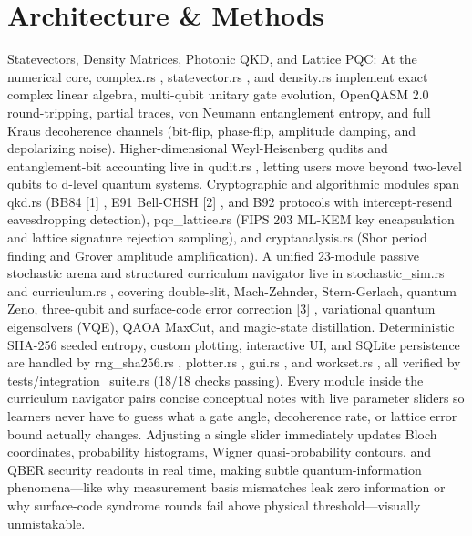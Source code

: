 \documentclass[10pt,letterpaper]{article}
\begin{document}
\section{Architecture \& Methods}
Statevectors, Density Matrices, Photonic QKD, and Lattice PQC: At the numerical core, complex.rs , statevector.rs , and density.rs implement exact complex linear algebra, multi-qubit unitary gate evolution, OpenQASM 2.0 round-tripping, partial traces, von Neumann entanglement entropy, and full Kraus decoherence channels (bit-flip, phase-flip, amplitude damping, and depolarizing noise). Higher-dimensional Weyl-Heisenberg qudits and entanglement-bit accounting live in qudit.rs , letting users move beyond two-level qubits to d-level quantum systems. Cryptographic and algorithmic modules span qkd.rs (BB84 [1] , E91 Bell-CHSH [2] , and B92 protocols with intercept-resend eavesdropping detection), pqc\_lattice.rs (FIPS 203 ML-KEM key encapsulation and lattice signature rejection sampling), and cryptanalysis.rs (Shor period finding and Grover amplitude amplification). A unified 23-module passive stochastic arena and structured curriculum navigator live in stochastic\_sim.rs and curriculum.rs , covering double-slit, Mach-Zehnder, Stern-Gerlach, quantum Zeno, three-qubit and surface-code error correction [3] , variational quantum eigensolvers (VQE), QAOA MaxCut, and magic-state distillation. Deterministic SHA-256 seeded entropy, custom plotting, interactive UI, and SQLite persistence are handled by rng\_sha256.rs , plotter.rs , gui.rs , and workset.rs , all verified by tests/integration\_suite.rs (18/18 checks passing). Every module inside the curriculum navigator pairs concise conceptual notes with live parameter sliders so learners never have to guess what a gate angle, decoherence rate, or lattice error bound actually changes. Adjusting a single slider immediately updates Bloch coordinates, probability histograms, Wigner quasi-probability contours, and QBER security readouts in real time, making subtle quantum-information phenomena---like why measurement basis mismatches leak zero information or why surface-code syndrome rounds fail above physical threshold---visually unmistakable.
\end{document}
